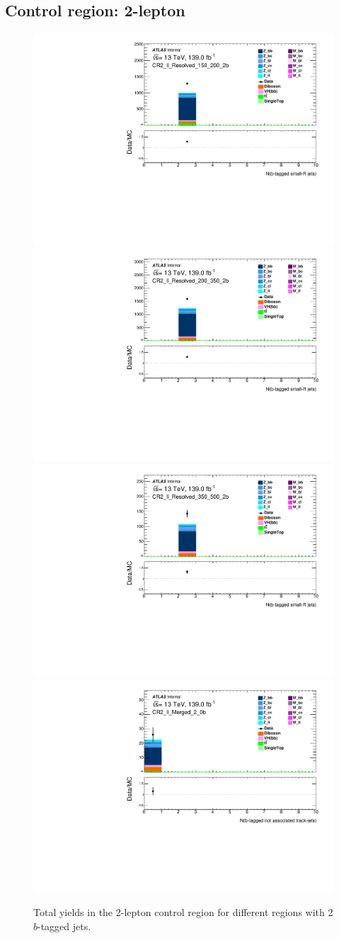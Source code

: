\subsection{Control region: 2-lepton}

\begin{figure}[!htb]
    \includegraphics[width=0.46\linewidth]{chapters/c8/figures/2L/DataMC_MonoH_Nominal_CR2_ll_Resolved_150_200_2b_N_BJets_04.pdf}
    \includegraphics[width=0.46\linewidth]{chapters/c8/figures/2L/DataMC_MonoH_Nominal_CR2_ll_Resolved_200_350_2b_N_BJets_04.pdf}\\
    \includegraphics[width=0.46\linewidth]{chapters/c8/figures/2L/DataMC_MonoH_Nominal_CR2_ll_Resolved_350_500_2b_N_BJets_04.pdf}
    \includegraphics[width=0.46\linewidth]{chapters/c8/figures/2L/DataMC_MonoH_Nominal_CR2_ll_Merged_2_0b_N_BTags_not_associated_02.pdf}
    \caption{Total yields in the 2-lepton control region for different \met regions with 2 $b$-tagged jets.}
    \label{fig:data-mc-2l-ll-mjj-2b}
\end{figure}
  
